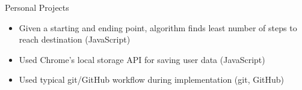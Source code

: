\documentclass{resume} %
\begin{document}
\begin{workSection}{Personal Projects}
    \customItem[
        title=Chess Knight Path Finder,
        duration=Spring 2023,
        keyHighlight=Used DFS graph traversal to find the most optimal path for chess knight.
    ]
    \begin{itemize}
        \vspace{-0.5em}
        \itemsep -6pt {}
        \item Given a starting and ending point, algorithm finds least number of steps to reach destination (JavaScript)
    \end{itemize}
    \customItem[
        title=To Do List Webapp,
        duration=Fall 2022,
        keyHighlight=Developed interactive to-do list webapp with local save function through vanilla HTML{,} CSS \& JS
    ]
    \begin{itemize}
        \vspace{-0.5em}
        \itemsep -6pt {}
        \item Used Chrome's local storage API for saving user data (JavaScript)
        \item Used typical git/GitHub workflow during implementation (git, GitHub)
    \end{itemize}
\end{workSection}
\end{document}
